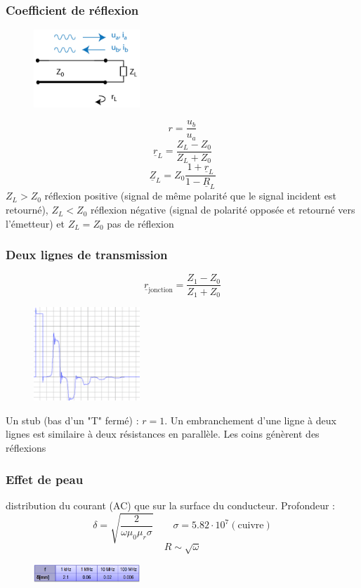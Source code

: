 \documentclass[resume]{subfiles}
\begin{document}
\begin{multicols}{3}
\subsubsection{Coefficient de réflexion}
\begin{figure}[H]
\centering
\includegraphics[width=4.00cm]{img_13.png}
\end{figure}
$$r=\frac{u_b}{u_a}$$
$$\underline{r}_L=\frac{Z_L-Z_0}{Z_L+Z_0}$$
$$\underline{Z}_L=Z_0\frac{1+\underline{r}_L}{1-\underline{R}_L}$$
$Z_L>Z_0$ réflexion positive (signal de même polarité que le signal incident est retourné), $Z_L<Z_0$ réflexion négative (signal de polarité opposée et retourné vers l'émetteur) et $Z_L=Z_0$ pas de réflexion\\
\subsubsection{Deux lignes de transmission}
$$\underline{r}_{\text{jonction}}=\frac{Z_1-Z_0}{Z_1+Z_0}$$
\begin{figure}[H]
\centering
\includegraphics[width=4.00cm]{img_14.png}
\end{figure}
Un stub (bas d'un "T" fermé) : $r=1$. Un embranchement d'une ligne à deux lignes est similaire à deux résistances en parallèle. Les coins génèrent des réflexions
\subsubsection{Effet de peau}
distribution du courant (AC) que sur la surface du conducteur. Profondeur : 
$$\delta = \sqrt{\frac{2}{\omega \mu_0 \mu_r \sigma}} \qquad \sigma = 5.82\cdot 10^{7}(\text{cuivre})$$
$$R\sim \sqrt{\omega}$$
\begin{figure}[H]
\centering
\includegraphics[width=4.00cm]{img_17.png} 
\end{figure}

\end{multicols}
\end{document}
